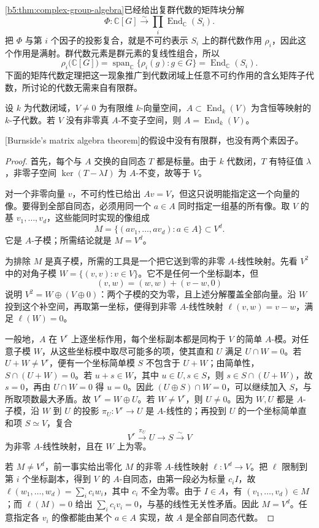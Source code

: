 \cref{b5:thm:complex-group-algebra}已经给出复群代数的矩阵块分解
\[
	\Phi:\mathbb C[G]\xrightarrow{\sim}\prod_i\operatorname{End}_{\mathbb C}(S_i).
\]
把 \(\Phi\) 与第 \(i\) 个因子的投影复合，就是不可约表示 \(S_i\) 上的群代数作用 \(\rho_i\)，因此这个作用是满射。群代数元素是群元素的复线性组合，所以
\[
	\rho_i\bigl(\mathbb C[G]\bigr) =\operatorname{span}_{\mathbb C}\{\rho_i(g):g\in G\} =\operatorname{End}_{\mathbb C}(S_i).
\]
下面的矩阵代数定理把这一现象推广到代数闭域上任意不可约作用的含幺矩阵子代数，所讨论的代数无需来自有限群。
\begin{theorem}\label{b5:thm:burnside-matrix-algebra}
	设 \(k\) 为代数闭域，\(V\ne0\) 为有限维 \(k\)-向量空间，\(A\subset\operatorname{End}_k(V)\) 为含恒等映射的 \(k\)-子代数。若 \(V\) 没有非零真 \(A\)-不变子空间，则 \(A=\operatorname{End}_k(V)\)。
\end{theorem}
[Burnside's matrix algebra theorem]的假设中没有有限群，也没有两个素因子。
\begin{proof}
	首先，每个与 \(A\) 交换的自同态 \(T\) 都是标量。由于 \(k\) 代数闭，\(T\) 有特征值 \(\lambda\)，非零子空间 \(\ker(T-\lambda I)\) 为 \(A\)-不变，故等于 \(V\)。

	对一个非零向量 \(v\)，不可约性已给出 \(Av=V\)，但这只说明能指定这一个向量的像。要得到全部自同态，必须用同一个 \(a\in A\) 同时指定一组基的所有像。取 \(V\) 的基 \(v_1,\ldots,v_d\)，这些能同时实现的像组成
	\[
		M=\bigl\{(av_1,\ldots,av_d):a\in A\bigr\}\subset V^d.
	\]
	它是 \(A\)-子模；所需结论就是 \(M=V^d\)。

	为排除 \(M\) 是真子模，所需的工具是一个把它送到零的非零 \(A\)-线性映射。先看 \(V^2\) 中的对角子模 \(W=\{(v,v):v\in V\}\)。它不是任何一个坐标副本，但
	\[
		(v,w)=(w,w)+(v-w,0)
	\]
	说明 \(V^2=W\oplus(V\oplus0)\)：两个子模的交为零，且上述分解覆盖全部向量。沿 \(W\) 投到这个补空间，再取第一坐标，便得到非零 \(A\)-线性映射 \(\ell(v,w)=v-w\)，满足 \(\ell(W)=0\)。

	一般地，\(A\) 在 \(V^r\) 上逐坐标作用，每个坐标副本都是同构于 \(V\) 的简单 \(A\)-模。对任意子模 \(W\)，从这些坐标模中取尽可能多的项，使其直和 \(U\) 满足 \(U\cap W=0\)。若 \(U+W\ne V^r\)，便有一个坐标简单模 \(S\) 不包含于 \(U+W\)；由简单性，\(S\cap(U+W)=0\)。若 \(u+s\in W\)，其中 \(u\in U,s\in S\)，则 \(s\in S\cap(U+W)\)，故 \(s=0\)，再由 \(U\cap W=0\) 得 \(u=0\)。因此 \((U\oplus S)\cap W=0\)，可以继续加入 \(S\)，与所取项数最大矛盾。故 \(V^r=W\oplus U\)。若 \(W\ne V^r\)，则 \(U\ne0\)。因为 \(W,U\) 都是 \(A\)-子模，沿 \(W\) 到 \(U\) 的投影 \(\pi_U:V^r\rightarrow U\) 是 \(A\)-线性的；再投到 \(U\) 的一个坐标简单直和项 \(S\simeq V\)，复合
	\[
		V^r\xrightarrow{\pi_U}U\longrightarrow S\xrightarrow{\sim}V
	\]
	为非零 \(A\)-线性映射，且在 \(W\) 上为零。

	若 \(M\ne V^d\)，前一事实给出零化 \(M\) 的非零 \(A\)-线性映射 \(\ell:V^d\rightarrow V\)。把 \(\ell\) 限制到第 \(i\) 个坐标副本，得到 \(V\) 的 \(A\)-自同态，由第一段必为标量 \(c_iI\)，故 \(\ell(w_1,\ldots,w_d)=\sum_i c_iw_i\)，其中 \(c_i\) 不全为零。由于 \(I\in A\)，有 \((v_1,\ldots,v_d)\in M\)；而 \(\ell(M)=0\) 给出 \(\sum_i c_i v_i=0\)，与基的线性无关性矛盾。因此 \(M=V^d\)。任意指定各 \(v_i\) 的像都能由某个 \(a\in A\) 实现，故 \(A\) 是全部自同态代数。
\end{proof}

